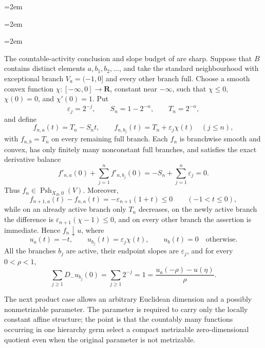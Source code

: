 
\begingroup
\emergencystretch=2em

\endgroup


\begingroup
\emergencystretch=2em

\endgroup


\begingroup
\emergencystretch=2em

\endgroup

\begin{example}
\label{ex:ch16-infinite-star-sharp-budget}
The countable-activity conclusion and slope budget of
 are sharp.  Suppose that
$B$ contains distinct elements $a,b_1,b_2,\ldots$, and take the standard
neighbourhood with exceptional branch $V_a=(-1,0]$ and every other branch
full.  Choose a smooth convex function
$\chi:[-\infty,0]\to\mathbf R$, constant near $-\infty$, such that
$\chi\leq0$, $\chi(0)=0$, and $\chi'(0)=1$.  Put
\[
 \varepsilon_j=2^{-j},\qquad
 S_n=1-2^{-n},\qquad
 T_n=2^{-n},
\]
and define
\[
 f_{n,a}(t)=T_n-S_nt,
 \qquad
 f_{n,b_j}(t)=T_n+\varepsilon_j\chi(t)\quad(j\leq n),
\]
with $f_{n,b}=T_n$ on every remaining full branch.  Each $f_n$ is
branchwise smooth and convex, has only finitely many nonconstant full
branches, and satisfies the exact derivative balance
\[
 f'_{n,a}(0)+\sum_{j=1}^n f'_{n,b_j}(0)
   =-S_n+\sum_{j=1}^n\varepsilon_j=0.
\]
Thus $f_n\in\operatorname{Psh}_{X_B,0}(V)$.  Moreover,
\[
 f_{n+1,a}(t)-f_{n,a}(t)
   =-\varepsilon_{n+1}(1+t)\leq0
 \qquad(-1<t\leq0),
\]
while on an already active branch only $T_n$ decreases, on the newly
active branch the difference is
$\varepsilon_{n+1}(\chi-1)\leq0$, and on every other branch the assertion
is immediate.  Hence $f_n\downarrow u$, where
\[
 u_a(t)=-t,
 \qquad
 u_{b_j}(t)=\varepsilon_j\chi(t),
 \qquad
 u_b(t)=0\quad\text{otherwise}.
\]
All the branches $b_j$ are active, their endpoint slopes are
$\varepsilon_j$, and for every $0<\rho<1$,
\[
 \sum_{j\geq1}D_-u_{b_j}(0)=\sum_{j\geq1}2^{-j}=1
   =\frac{u_a(-\rho)-u(\eta)}{\rho}.
\]
\end{example}

The next product case allows an arbitrary Euclidean dimension and a
possibly nonmetrizable parameter.  The parameter is required to carry only
the locally constant affine structure; the point is that the countably many
functions occurring in one hierarchy germ select a compact metrizable
zero-dimensional quotient even when the original parameter is not
metrizable.

